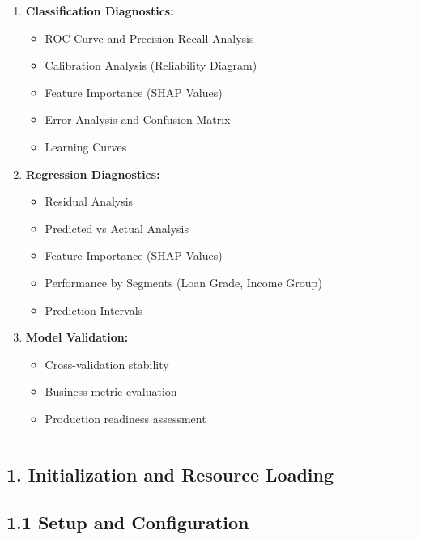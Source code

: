 \documentclass[11pt]{article}
\providecommand{\tightlist}{%
      \setlength{\itemsep}{0pt}\setlength{\parskip}{0pt}}
\begin{document}
\begin{enumerate}
\def\labelenumi{\arabic{enumi}.}
\tightlist
\item
  \textbf{Classification Diagnostics:}

  \begin{itemize}
  \tightlist
  \item
    ROC Curve and Precision-Recall Analysis
  \item
    Calibration Analysis (Reliability Diagram)
  \item
    Feature Importance (SHAP Values)
  \item
    Error Analysis and Confusion Matrix
  \item
    Learning Curves
  \end{itemize}
\item
  \textbf{Regression Diagnostics:}

  \begin{itemize}
  \tightlist
  \item
    Residual Analysis
  \item
    Predicted vs Actual Analysis
  \item
    Feature Importance (SHAP Values)
  \item
    Performance by Segments (Loan Grade, Income Group)
  \item
    Prediction Intervals
  \end{itemize}
\item
  \textbf{Model Validation:}

  \begin{itemize}
  \tightlist
  \item
    Cross-validation stability
  \item
    Business metric evaluation
  \item
    Production readiness assessment
  \end{itemize}
\end{enumerate}

\begin{center}\rule{0.5\linewidth}{0.5pt}\end{center}

    \subsection{\texorpdfstring{\textbf{1. Initialization and Resource
Loading}}{1. Initialization and Resource Loading}}\label{initialization-and-resource-loading}

\subsection{\texorpdfstring{\textbf{1.1 Setup and
Configuration}}{1.1 Setup and Configuration}}\label{setup-and-configuration}
\end{document}
